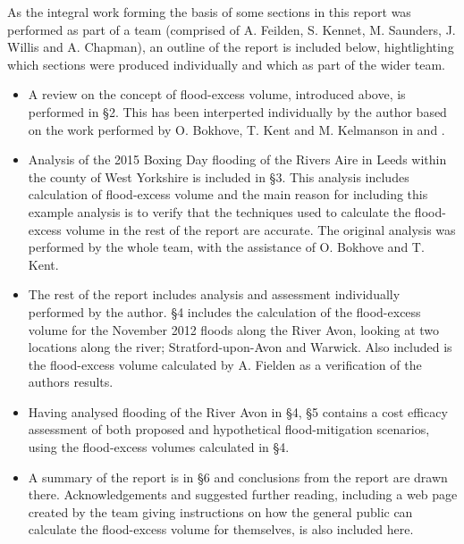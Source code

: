 \documentclass[11pt,a4paper]{article}
\begin{document}
As the integral work forming the basis of some sections in this report was performed as part of a team (comprised of A. Feilden, S. Kennet, M. Saunders, J. Willis and A. Chapman), an outline of the report is included below, hightlighting which sections were produced individually and which as part of the wider team.
\begin{framed}
\begin{itemize}
\item A review on the concept of flood-excess volume, introduced above, is performed in \S 2. This has been interperted individually by the author based on the work performed by O. Bokhove, T. Kent and M. Kelmanson in \cite{Aire} and \cite{Calder-Don}.
\item Analysis of the 2015 Boxing Day flooding of the Rivers Aire in Leeds within the county of West Yorkshire is included in \S 3. This analysis includes calculation of flood-excess volume and the main reason for including this example analysis is to verify that the techniques used to calculate the flood-excess volume in the rest of the report are accurate. The original analysis was performed by the whole team, with the assistance of O. Bokhove and T. Kent.
\item The rest of the report includes analysis and assessment individually performed by the author. \S 4 includes the calculation of the flood-excess volume for the November 2012 floods along the River Avon, looking at two locations along the river{;} Stratford-upon-Avon and Warwick. Also included is the flood-excess volume calculated by A. Fielden as a verification of the authors results.
\item Having analysed flooding of the River Avon in \S 4, \S 5 contains a cost efficacy assessment of both proposed and hypothetical flood-mitigation scenarios, using the flood-excess volumes calculated in \S 4.
\item A summary of the report is in \S 6 and conclusions from the report are drawn there. Acknowledgements and suggested further reading, including a web page created by the team giving instructions on how the general public can calculate the flood-excess volume for themselves, is also included here.
\end{itemize}
\end{framed}
\end{document}
